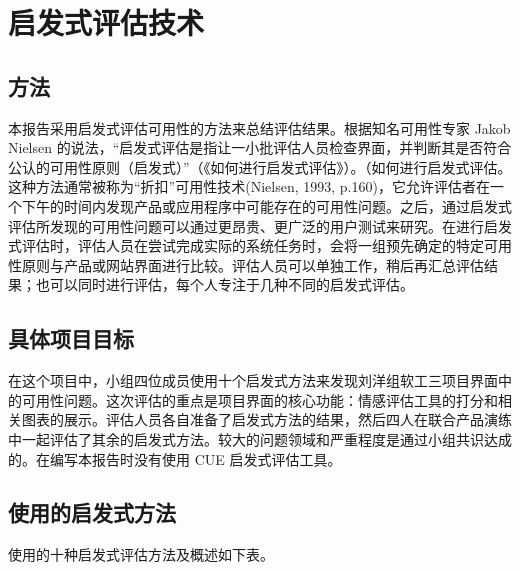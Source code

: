 \section{启发式评估技术}

\subsection{方法}
本报告采用启发式评估可用性的方法来总结评估结果。根据知名可用性专家 Jakob
Nielsen 的说法，“启发式评估是指让一小批评估人员检查界面，并判断其是否符合公认的可用性原则（启发式）”（《如何进行启发式评估》）。（如何进行启发式评估。这种方法通常被称为“折扣”可用性技术(Nielsen, 1993, p.160)，它允许评估者在一个下午的时间内发现产品或应用程序中可能存在的可用性问题。之后，通过启发式评估所发现的可用性问题可以通过更昂贵、更广泛的用户测试来研究。在进行启发式评估时，评估人员在尝试完成实际的系统任务时，会将一组预先确定的特定可用性原则与产品或网站界面进行比较。评估人员可以单独工作，稍后再汇总评估结果；也可以同时进行评估，每个人专注于几种不同的启发式评估。

\subsection{具体项目目标}
在这个项目中，小组四位成员使用十个启发式方法来发现刘洋组软工三项目界面中的可用性问题。这次评估的重点是项目界面的核心功能：情感评估工具的打分和相关图表的展示。评估人员各自准备了启发式方法的结果，然后四人在联合产品演练中一起评估了其余的启发式方法。较大的问题领域和严重程度是通过小组共识达成的。在编写本报告时没有使用 CUE 启发式评估工具。

\subsection{使用的启发式方法}
使用的十种启发式评估方法及概述如下表。

